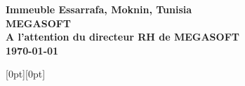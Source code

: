 \documentclass[a4paper, 12pt]{letter}
\begin{document}
\begin{letter}
{{{    \bfseries
    Immeuble Essarrafa, Moknin, Tunisia\\
    MEGASOFT  \\A l'attention du directeur RH de MEGASOFT   \\
      \today
    }
  }%
}

\hspace{13cm}%
\raisebox{-1cm}[0pt][0pt]{
\setlength{\fboxrule}{0pt}
}




\end{letter}
\end{document}
